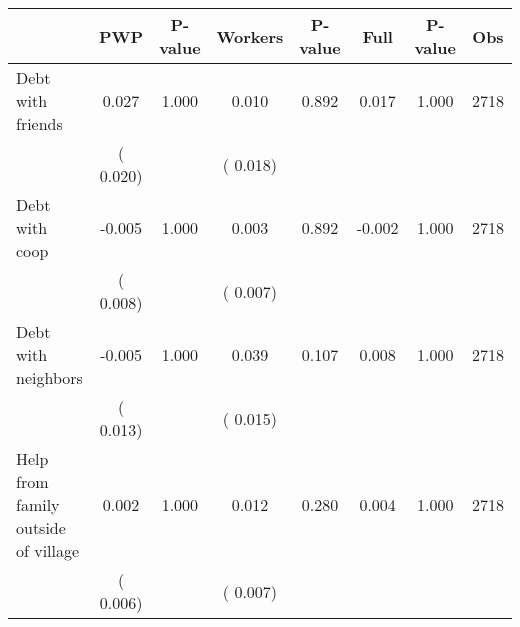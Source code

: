 
\begin{tabular}{l*{7}{c}}\hline&\multicolumn{1}{c}{PWP}&\multicolumn{1}{c}{P-value}&\multicolumn{1}{c}{Workers}&\multicolumn{1}{c}{P-value}&\multicolumn{1}{c}{Full}&\multicolumn{1}{c}{P-value}&\multicolumn{1}{c}{Obs} \\ \hline

 Debt with friends       &              0.027       &        1.000  &              0.010       &        0.892  &              0.017       &              1.000 &  2718 \\ 
                       &       (       0.020)             &                               &       (       0.018)                     &                               &                                               &                                &                      \\ 

 Debt with coop       &             -0.005       &        1.000  &              0.003       &        0.892  &             -0.002       &              1.000 &  2718 \\ 
                       &       (       0.008)             &                               &       (       0.007)                     &                               &                                               &                                &                      \\ 

 Debt with neighbors       &             -0.005       &        1.000  &              0.039       &        0.107  &              0.008       &              1.000 &  2718 \\ 
                       &       (       0.013)             &                               &       (       0.015)                     &                               &                                               &                                &                      \\ 

 Help from family outside of village       &              0.002       &        1.000  &              0.012       &        0.280  &              0.004       &              1.000 &  2718 \\ 
                       &       (       0.006)             &                               &       (       0.007)                     &                               &                                               &                                &                      \\ 


\end{tabular}
